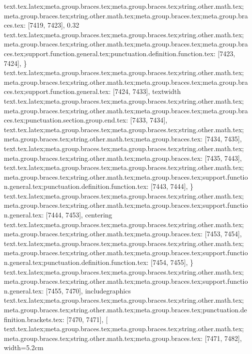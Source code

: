 {{{{{{{{{{{{{{{{{{{{{{{{{{{{{{{{{{{{{{{{{{{{{{{{{{{{{{{{{{{{{{{{{{{{{{{{{{{{{{{{{{{{{{{{{{{{{{{{{{{{{{{{{{{{{{{{{{{{{{{{{{{{{{{{{{{{{{{{{{{{{{{{{{{{{{{{{{{{{{{{{{{{{{{{{{{{{{{{{{{{{{{{{{{{{{{{{{{{{{{{{{text.tex.latex;meta.group.braces.tex;meta.group.braces.tex;string.other.math.tex;meta.group.braces.tex;string.other.math.tex;meta.group.braces.tex;meta.group.braces.tex: [7419, 7423], {0.32}
text.tex.latex;meta.group.braces.tex;meta.group.braces.tex;string.other.math.tex;meta.group.braces.tex;string.other.math.tex;meta.group.braces.tex;meta.group.braces.tex;support.function.general.tex;punctuation.definition.function.tex: [7423, 7424], {\}
text.tex.latex;meta.group.braces.tex;meta.group.braces.tex;string.other.math.tex;meta.group.braces.tex;string.other.math.tex;meta.group.braces.tex;meta.group.braces.tex;support.function.general.tex: [7424, 7433], {textwidth}
text.tex.latex;meta.group.braces.tex;meta.group.braces.tex;string.other.math.tex;meta.group.braces.tex;string.other.math.tex;meta.group.braces.tex;meta.group.braces.tex;punctuation.section.group.end.tex: [7433, 7434], {}}
text.tex.latex;meta.group.braces.tex;meta.group.braces.tex;string.other.math.tex;meta.group.braces.tex;string.other.math.tex;meta.group.braces.tex: [7434, 7435], {
}
text.tex.latex;meta.group.braces.tex;meta.group.braces.tex;string.other.math.tex;meta.group.braces.tex;string.other.math.tex;meta.group.braces.tex: [7435, 7443], {        }
text.tex.latex;meta.group.braces.tex;meta.group.braces.tex;string.other.math.tex;meta.group.braces.tex;string.other.math.tex;meta.group.braces.tex;support.function.general.tex;punctuation.definition.function.tex: [7443, 7444], {\}
text.tex.latex;meta.group.braces.tex;meta.group.braces.tex;string.other.math.tex;meta.group.braces.tex;string.other.math.tex;meta.group.braces.tex;support.function.general.tex: [7444, 7453], {centering}
text.tex.latex;meta.group.braces.tex;meta.group.braces.tex;string.other.math.tex;meta.group.braces.tex;string.other.math.tex;meta.group.braces.tex: [7453, 7454], { }
text.tex.latex;meta.group.braces.tex;meta.group.braces.tex;string.other.math.tex;meta.group.braces.tex;string.other.math.tex;meta.group.braces.tex;support.function.general.tex;punctuation.definition.function.tex: [7454, 7455], {\}
text.tex.latex;meta.group.braces.tex;meta.group.braces.tex;string.other.math.tex;meta.group.braces.tex;string.other.math.tex;meta.group.braces.tex;support.function.general.tex: [7455, 7470], {includegraphics}
text.tex.latex;meta.group.braces.tex;meta.group.braces.tex;string.other.math.tex;meta.group.braces.tex;string.other.math.tex;meta.group.braces.tex;punctuation.definition.brackets.tex: [7470, 7471], {[}
text.tex.latex;meta.group.braces.tex;meta.group.braces.tex;string.other.math.tex;meta.group.braces.tex;string.other.math.tex;meta.group.braces.tex: [7471, 7482], {width=5.2cm}
}}}}}}}}}}}}}}}}}}}}}}}}}}}}}}}}}}}}}}}}}}}}}}}}}}}}}}}}}}}}}}}}}}}}}}}}}}}}}}}}}}}}}}}}}}}}}}}}}}}}}}}}}}}}}}}}}}}}}}}}}}}}}}}}}}}}}}}}}}}}}}}}}}}}}}}}}}}}}}}}}}}}}}}}}}}}}}}}}}}}}}}}}}}}}}}}}}}}}}}}}}}}
